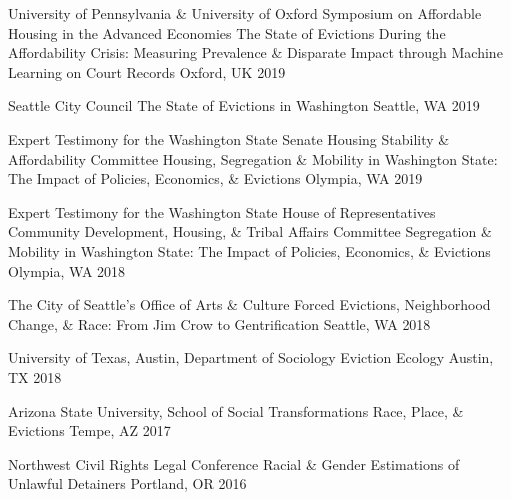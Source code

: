 \begin{cventries}
  \cventry
    {University of Pennsylvania \& University of Oxford Symposium on Affordable Housing in the Advanced Economies} %
    {The State of Evictions During the Affordability Crisis: Measuring Prevalence \& Disparate Impact through Machine Learning on Court Records} %
    {Oxford, UK} %
    {2019} %
    {}

  \cventry
    {Seattle City Council} %
    {The State of Evictions in Washington} %
    {Seattle, WA} %
    {2019} %
    {}

  \cventry
    {Expert Testimony for the Washington State Senate Housing Stability \& Affordability Committee} %
    {Housing, Segregation \& Mobility in Washington State: The Impact of Policies, Economics, \& Evictions} %
    {Olympia, WA} %
    {2019} %
    {}

  \cventry
    {Expert Testimony for the Washington State House of Representatives Community Development, Housing, \& Tribal Affairs Committee} %
    {Segregation \& Mobility in Washington State: The Impact of Policies, Economics, \& Evictions} %
    {Olympia, WA} %
    {2018} %
    {}

  \cventry
    {The City of Seattle’s Office of Arts \& Culture} %
    {Forced Evictions, Neighborhood Change, \& Race: From Jim Crow to Gentrification} %
    {Seattle, WA} %
    {2018} %
    {}

  \cventry
    {University of Texas, Austin, Department of Sociology} %
    {Eviction Ecology} %
    {Austin, TX} %
    {2018} %
    {}

  \cventry
    {Arizona State University, School of Social Transformations} %
    {Race, Place, \& Evictions} %
    {Tempe, AZ} %
    {2017} %
    {}

  \cventry
    {Northwest Civil Rights Legal Conference} %
    {Racial \& Gender Estimations of Unlawful Detainers} %
    {Portland, OR} %
    {2016} %
    {}
    

\end{cventries}
